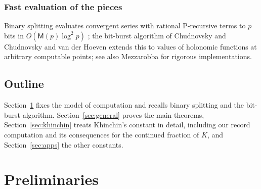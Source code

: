 \documentclass[11pt]{amsart}
\theoremstyle{definition}
\theoremstyle{remark}
\newcommand{\Mul}{\mathsf{M}}
\begin{document}
\subsubsection{Fast evaluation of the pieces}
Binary splitting evaluates convergent series with rational P-recursive terms to $p$ bits in
$O(\Mul(p)\log^2 p)$ \cite{HP98,CHTZZ07}; the bit-burst algorithm of Chudnovsky and
Chudnovsky \cite{CC90} and van der Hoeven \cite{vdH99} extends this to values of holonomic
functions at arbitrary computable points; see also Mezzarobba \cite{Mez10,Mez16} for rigorous
implementations.

\subsection{Outline}
Section~\ref{sec:prelim} fixes the model of computation and recalls binary splitting and the
bit-burst algorithm. Section~\ref{sec:general} proves the main theorems, Section~\ref{sec:khinchin} treats
Khinchin's constant in detail, including our record computation and its consequences for the continued fraction of
$K$, and Section~\ref{sec:apps} the other constants.

\section{Preliminaries}\label{sec:prelim}
\end{document}

